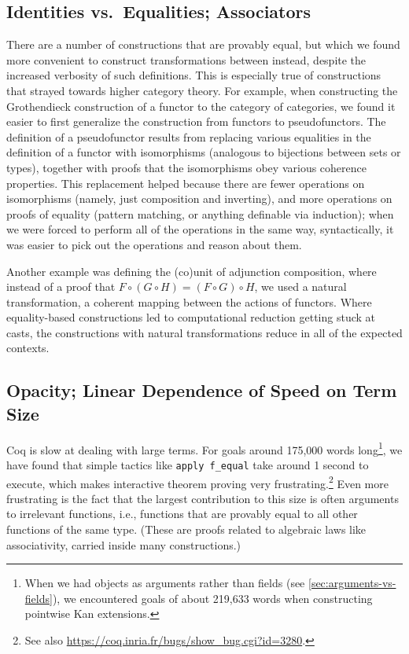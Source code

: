 \documentclass[runningheads]{llncs}
\begin{document}
  \subsection{Identities vs.~Equalities; Associators} \label{sec:associators}
    There are a number of constructions that are provably equal, but which we found more convenient to construct transformations between instead, despite the increased verbosity of such definitions.  This is especially true of constructions that strayed towards higher category theory.  For example, when constructing the Grothendieck construction of a functor to the category of categories, we found it easier to first generalize the construction from functors to pseudofunctors.  The definition of a pseudofunctor results from replacing various equalities in the definition of a functor with isomorphisms (analogous to bijections between sets or types), together with proofs that the isomorphisms obey various coherence properties.  This replacement helped because there are fewer operations on isomorphisms (namely, just composition and inverting), and more operations on proofs of equality (pattern matching, or anything definable via induction); when we were forced to perform all of the operations in the same way, syntactically, it was easier to pick out the operations and reason about them.

    Another example was defining the (co)unit of adjunction composition, where instead of a proof that $F \circ (G \circ H) = (F \circ G) \circ H$, we used a natural transformation, a coherent mapping between the actions of functors.  Where equality-based constructions led to computational reduction getting stuck at casts, the constructions with natural transformations reduce in all of the expected contexts.

  \subsection{Opacity; Linear Dependence of Speed on Term Size}\label{sec:equality-reflection}\label{sec:term-size}

    Coq is slow at dealing with large terms.  For goals around 175,000 words long\footnote{When we had objects as arguments rather than fields (see \autoref{sec:arguments-vs-fields}), we encountered goals of about 219,633 words when constructing pointwise Kan extensions.}, we have found that simple tactics like \texttt{apply f\_equal} take around 1 second to execute, which makes interactive theorem proving very frustrating.\footnote{See also \url{https://coq.inria.fr/bugs/show\_bug.cgi?id=3280}.}  Even more frustrating is the fact that the largest contribution to this size is often arguments to irrelevant functions, i.e., functions that are provably equal to all other functions of the same type.  (These are proofs related to algebraic laws like associativity, carried inside many constructions.)
\end{document}
